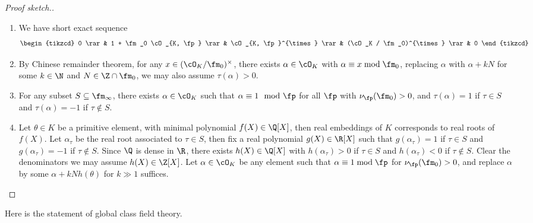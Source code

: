 \documentclass[11pt]{amsart}
\begin{document}
\begin{proof}[Proof sketch.]
\begin{enumerate}
        \item We have short exact sequence
            \[
              \begin{tikzcd}
                 0 \rar & 1 + \fm_0 \cO_{K, \fp} \rar & \cO_{K, \fp}^{\times}
                 \rar & (\cO_K / \fm_0)^{\times} \rar & 0
              \end{tikzcd}
            \]

        \item By Chinese remainder theorem, for any $x \in (\cO_K \slash
            \fm_0)^{\times}$, there exists $\alpha \in \cO_K$ with $\alpha
            \equiv x \bmod{\fm_0}$, replacing $\alpha$ with $\alpha + kN$ for
            some $k \in \N$ and $N \in \Z \cap \fm_0$, we may also assume
            $\tau(\alpha) > 0$.

        \item For any subset $S \subseteq \fm_{\infty}$, there exists $\alpha
            \in \cO_K$ such that $\alpha \equiv 1 \mod{\fp}$ for all $\fp$ with
            $\nu_{\fp}(\fm_0) > 0$, and $\tau(\alpha) = 1$ if $\tau \in S$ and
            $\tau(\alpha) = -1$ if $\tau \not\in S$.

        \item Let $\theta \in K$ be a primitive element, with minimal polynomial
            $f(X) \in \Q[X]$, then real embeddings of $K$ corresponds to real
            roots of $f(X)$.  Let $\alpha_\tau$ be the real root associated to
            $\tau \in S$, then fix a real polynomial $g(X) \in \R[X]$ such that
            $g(\alpha_\tau) = 1$ if $\tau \in S$ and $g(\alpha_\tau) = -1$ if
            $\tau \not\in S$.  Since $\Q$ is dense in $\R$, there exists $h(X)
            \in \Q[X]$ with $h(\alpha_\tau) > 0$ if $\tau \in S$ and
            $h(\alpha_\tau) < 0$ if $\tau \not\in S$.  Clear the denominators we
            may assume $h(X) \in \Z[X]$.  Let $\alpha \in \cO_K$ be any element
            such that $\alpha \equiv 1 \bmod{\fp}$ for $\nu_{\fp}(\fm_0) > 0$,
            and replace $\alpha$ by some $\alpha + kNh(\theta)$ for $k \gg 1$
            suffices.
    \end{enumerate}
\end{proof}

Here is the statement of global class field theory.
\end{document}
